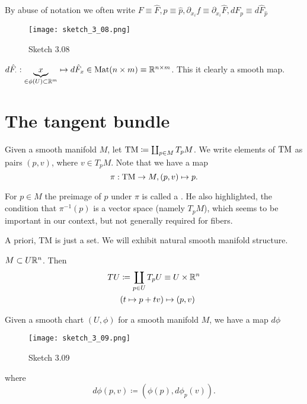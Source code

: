 
\begin{remark}
    By abuse of notation we often write \(F\equiv \hat{F},p\equiv \hat{p},\partial_{x_i}f\equiv \partial_{x_i}\hat{F}, dF_p\equiv d\hat{F}_{\hat{p}}\)
    \begin{figure}[H]
        \centering
        \texttt{[image: sketch\_3\_08.png]}
        \caption{Sketch 3.08}
    \end{figure}
\end{remark}

\begin{remark}
    \(d\hat{F}_{\cdot}:\underbrace{x}_{\in \phi(U)\subset \mathbb{R}^m}\mapsto d\hat{F}_x\in \text{Mat}(n\times m)\equiv \mathbb{R}^{n\times m}\). This it clearly 
    a smooth map.
\end{remark}

\section{The tangent bundle}

\begin{definition*}
    Given a smooth manifold \(M\), let \({\text{TM}}\coloneqq \coprod_{p\in M} T_p M\). We write 
    elements of \({\text{TM}}\) as pairs \((p,v)\), where \(v\in T_p M\). Note that we have a map 
    \[\pi:{\text{TM}}\to M, (p,v)\mapsto p.\]
\end{definition*}

\begin{remark}
    For \(p\in M\) the preimage of \(p\) under \(\pi\) is called a . 
    He also highlighted, the condition that \(\pi^{-1}(p)\) is a vector space (namely \(T_pM\)),
    which seems to be important in our context, but not generally required for fibers. 
\end{remark}

A priori, TM is just a set. We will exhibit natural smooth manifold structure. 

 \(M\subset U\mathbb{R}^n\). Then \begin{align*}
    TU&\coloneqq \coprod_{p\in U} T_p U\equiv U\times \R^n\\
    & (t\mapsto  p+tv)\mapsto(p,v) %
\end{align*}

 Given a smooth chart \((U,\phi)\) for a smooth manifold \(M\), we have a map \(d\phi\)
\begin{figure}[H]
    \centering
    \texttt{[image: sketch\_3\_09.png]}
    \caption{Sketch 3.09}
\end{figure}
where \[d\phi(p,v)\coloneqq (\phi(p),d\phi_p(v)).\]

